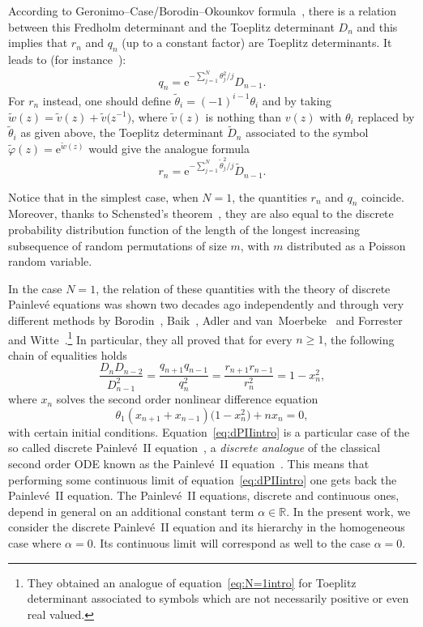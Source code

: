 \documentclass[pdftex]{sigma}%
\numberwithin{equation}{section}
\def\e{\mathrm{e}}
\newcommand{\R}{\mathbb{R}}
\begin{document}
According to Geronimo--Case/Borodin--Okounkov formula~\cite{BO99}, there is a relation between this Fredholm determinant and the Toeplitz determinant $D_n$ and this implies that $r_n$ and $q_n$ (up to a constant factor) are Toeplitz determinants. It leads to (for instance~\cite[Propositions~6 and 7]{betea2021multicritical}):
\begin{gather}
\label{eq:qn}
q_n = \e^{-\sum_{j=1}^N\theta_j^2/j} D_{n-1}.
\end{gather}
For $r_n $ instead, one should define $\widetilde{\theta}_i=(-1)^{i-1}\theta_i$ and by taking $\tilde{w}(z)= \tilde{v}(z)+ \tilde{v}\big(z^{-1}\big)$, where $\tilde{v}(z)$ is nothing than $v(z)$ with $\theta_i$ replaced by $\tilde{\theta}_i$ as given above, the Toeplitz determinant $\widetilde{D}_n$ associated to the symbol $ \widetilde{\varphi}(z)=\e^{\tilde{w}(z)}$ would give the analogue formula
\begin{equation*}
	\label{eq:pn}
	r_n = \e^{-\sum_{j=1}^N\widetilde{\theta}_j^2/j} \widetilde{D}_{n-1}.
\end{equation*}

Notice that in the simplest case, when $N=1$, the quantities $r_n$ and $q_n $ coincide. Moreover, thanks to Schensted's theorem~\cite{Schensted}, they are also equal to the discrete probability distribution function of the length of the longest increasing subsequence of random permutations of size $m$, with $m$ distributed as a Poisson random variable.

 In the case $N=1$, the relation of these quantities with the theory of discrete Painlev\'e equations was shown two decades ago independently and through very different methods by Borodin~\cite{Borodindiscrete}, Baik~\cite{BaikRHforlastpassageperc}, Adler and van~Moerbeke~\cite{AV} and Forrester and Witte~\cite{FW04}.\footnote{They obtained an analogue of equation~\eqref{eq:N=1intro} for Toeplitz determinant associated to symbols which are not necessarily positive or even real valued.} In particular, they all proved that for every $n \geq 1$, the following chain of equalities holds
\begin{equation}
\label{eq:N=1intro}
\frac{D_{n}D_{n-2}}{D_{n-1}^2}=\frac{q_{n+1}q_{n-1}}{q_{n}^2}=\frac{r_{n+1}r_{n-1}}{r_{n}^2}=1-x_n^2,
\end{equation}
where $x_n$ solves the second order nonlinear difference equation
\begin{equation}
\label{eq:dPIIintro}
\theta_1(x_{n+1}+x_{n-1})\big(1-x_n^2\big)+n x_n=0,
\end{equation}
with certain initial conditions.
Equation~\eqref{eq:dPIIintro} is a particular case of the so called discrete Painlev\'e~II equation~\cite{GrammaticosdiscrPain}, a \textit{discrete analogue} of the classical second order ODE known as the Painlev\'e~II equation~\cite{painlev00}. This means that performing some continuous limit of equation~\eqref{eq:dPIIintro} one gets back the Painlev\'e~II equation. The Painlev\'e~II equations, discrete and continuous ones, depend in general on an additional constant term $\alpha\in\R$. In the present work, we consider the discrete Painlev\'e~II equation and its hierarchy in the homogeneous case where $\alpha=0$. Its continuous limit will correspond as well to the case $\alpha=0$.
\end{document}
